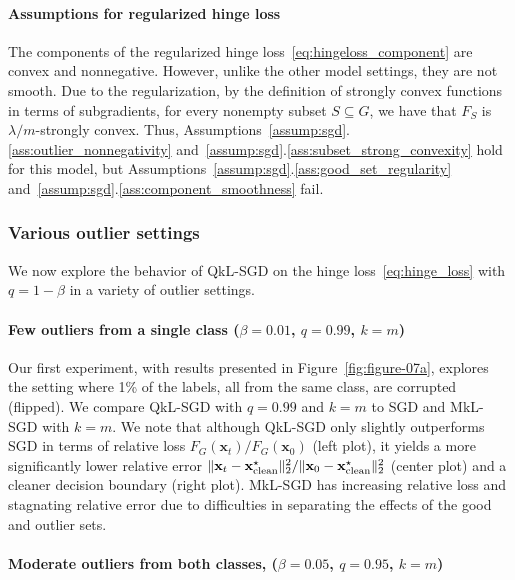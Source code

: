 \documentclass[11pt]{article}
\newcommand{\ve}[1]{\mathbf{#1}}
\begin{document}
\paragraph{Assumptions for regularized hinge loss}

The components of the regularized hinge loss~\eqref{eq:hingeloss_component} are convex and nonnegative.  However, unlike the other model settings, they are not smooth.  Due to the regularization, by the definition of strongly convex functions in terms of subgradients, for every nonempty subset $S \subseteq G$, we have that $F_S$ is $\lambda/m$-strongly convex.  Thus, Assumptions~\ref{assump:sgd}.\ref{ass:outlier_nonnegativity} and~\ref{assump:sgd}.\ref{ass:subset_strong_convexity} hold for this model, but Assumptions~\ref{assump:sgd}.\ref{ass:good_set_regularity} and~\ref{assump:sgd}.\ref{ass:component_smoothness} fail.


\subsubsection{Various outlier settings}

We now explore the behavior of QkL-SGD on the hinge loss~\eqref{eq:hinge_loss} with $q = 1 - \beta$ in a variety of outlier settings.

\paragraph{Few outliers from a single class (\texorpdfstring{$\beta = 0.01$, $q=0.99$, $k = m$}{beta = 0.01, q = 0.99, k = m})}

Our first experiment, with results presented in Figure~\ref{fig:figure-07a}, explores the setting where 1\% of the labels, all from the same class, are corrupted (flipped). We compare QkL-SGD with $q = 0.99$ and $k = m$ to SGD and MkL-SGD with $k = m$.  We note that although QkL-SGD only slightly outperforms SGD in terms of relative loss $F_G(\ve{x}_t)/F_G(\ve{x}_0)$ (left plot), it yields a more significantly lower relative error $\|\ve{x}_t - \ve{x}^\star_{\rm clean}\|_2^2/\|\ve{x}_0 - \ve{x}^\star_{\rm clean}\|_2^2$ (center plot) and a cleaner decision boundary (right plot). MkL-SGD has increasing relative loss and stagnating relative error due to difficulties in separating the effects of the good and outlier sets.


\paragraph{Moderate outliers from both classes, (\texorpdfstring{$\beta = 0.05$, $q=0.95$, $k = m$}{beta = 0.05, q = 0.95, k = m})}
\end{document}
